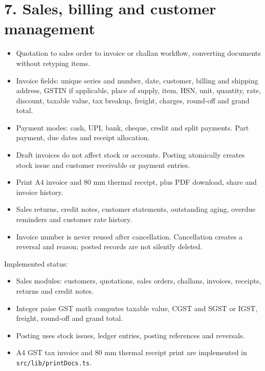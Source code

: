 \documentclass[11pt]{article}
\begin{document}
\section{7. Sales, billing and customer management}
\begin{itemize}[leftmargin=*,itemsep=2pt,topsep=2pt]
\item Quotation to sales order to invoice or challan workflow, converting documents without retyping items.
\item Invoice fields: unique series and number, date, customer, billing and shipping address, GSTIN if applicable, place of supply, item, HSN, unit, quantity, rate, discount, taxable value, tax breakup, freight, charges, round-off and grand total.
\item Payment modes: cash, UPI, bank, cheque, credit and split payments. Part payment, due dates and receipt allocation.
\item Draft invoices do not affect stock or accounts. Posting atomically creates stock issue and customer receivable or payment entries.
\item Print A4 invoice and 80 mm thermal receipt, plus PDF download, share and invoice history.
\item Sales returns, credit notes, customer statements, outstanding aging, overdue reminders and customer rate history.
\item Invoice number is never reused after cancellation. Cancellation creates a reversal and reason; posted records are not silently deleted.
\end{itemize}
Implemented status:
\begin{itemize}[leftmargin=*,itemsep=2pt,topsep=2pt]
\item Sales modules: customers, quotations, sales orders, challans, invoices, receipts, returns and credit notes.
\item Integer paise GST math computes taxable value, CGST and SGST or IGST, freight, round-off and grand total.
\item Posting uses stock issues, ledger entries, posting references and reversals.
\item A4 GST tax invoice and 80 mm thermal receipt print are implemented in \texttt{src/lib/printDocs.ts}.
\end{itemize}
\clearpage
\end{document}
